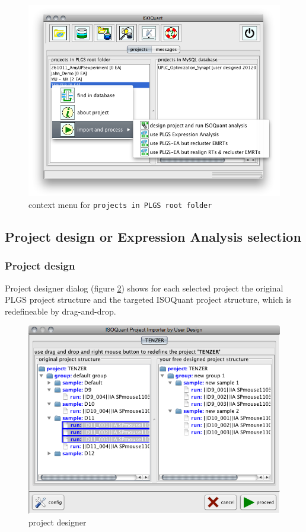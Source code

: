 \documentclass[]{article}
\makeatletter
\def\maxwidth{\ifdim\Gin@nat@width>\linewidth\linewidth
\else\Gin@nat@width\fi}
\let\Oldincludegraphics\includegraphics
\renewcommand{\includegraphics}[1]{\Oldincludegraphics[width=\maxwidth]{#1}}
\makeatother
\begin{document}
\begin{figure}[htbp]
\centering
\includegraphics{assets/isoquant/pics/fs_context.png}
\caption{context menu for \lstinline!projects in PLGS root folder!
\label{pic:fsMenu}}
\end{figure}

\subsection{Project design or Expression Analysis selection}

\subsubsection{Project design}

Project designer dialog (figure \ref{pic:prjDesigner}) shows for each
selected project the original PLGS project structure and the targeted
ISOQuant project structure, which is redefineable by drag-and-drop.

\begin{figure}[htbp]
\centering
\includegraphics{assets/isoquant/pics/project_designer.png}
\caption{project designer \label{pic:prjDesigner}}
\end{figure}
\end{document}
